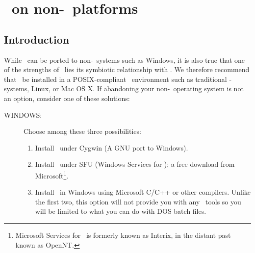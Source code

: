 %
%
\chapter{\gmt\ on non-\UNIX\ platforms}
\label{app:L}
\thispagestyle{headings}

\section{Introduction}

While \GMT\ can be ported to non-\UNIX\ systems such as
Windows, it is also true that one of the
strengths of \GMT\ lies its symbiotic relationship with
\UNIX.  We therefore recommend that \GMT\ be installed in
a POSIX-compliant \UNIX\ environment such as traditional \UNIX-systems, Linux,
or Mac OS X.  If abandoning your non-\UNIX\ operating system
is not an option, consider one of these solutions:

\begin{description}
\item [WINDOWS:] Choose among these three possibilities:

\begin{enumerate}

\item Install \GMT\ under Cygwin (A GNU port to Windows). 

\item Install \GMT\ under SFU (Windows Services for \UNIX); a free download from
Microsoft\footnote{Microsoft Services for \UNIX\ is formerly known as Interix, in the distant past known as OpenNT.}.

\item Install \GMT\ in Windows using Microsoft C/C++ or other
compilers.  Unlike the first two, this option will not provide you with any
\UNIX\ tools so you will be limited to what you can do with
DOS batch files.


\end{enumerate}

\end{description}

